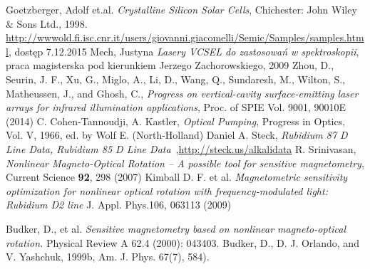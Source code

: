 \documentclass[a4paper,10pt,twoside]{report}
\begin{document}
\begin{thebibliography}{99}
 Goetzberger, Adolf et.al. \emph{Crystalline Silicon Solar Cells}, Chichester: John Wiley \& Sons Ltd., 1998.
 \url{http://wwwold.fi.isc.cnr.it/users/giovanni.giacomelli/Semic/Samples/samples.html}, dostęp 7.12.2015
  Mech, Justyna \emph{Lasery VCSEL do zastosowań w spektroskopii}, praca magisterska pod kierunkiem Jerzego Zachorowskiego, 2009
 Zhou, D., Seurin, J. F., Xu, G., Miglo, A., Li, D., Wang, Q., Sundaresh, M., Wilton, S., Matheussen, J., and  Ghosh, C., \emph{Progress on vertical-cavity surface-emitting laser arrays for infrared illumination applications},  Proc. of SPIE Vol. 9001, 90010E (2014)
  C. Cohen-Tannoudji, A. Kastler,
\emph{Optical  Pumping}, Progress in Optics, Vol. V, 1966, ed. by
Wolf E. (North-Holland)
 Daniel A. Steck, \emph{Rubidium 87 D Line Data, Rubidium 85 D Line Data}~,\url{http://steck.us/alkalidata}
 R. Srinivasan,\textit{ Nonlinear Magneto-Optical Rotation – A possible tool for sensitive magnetometry}, Current Science \textbf{92}, 298 (2007)
 Kimball D. F. et al.  \emph{Magnetometric sensitivity optimization for nonlinear optical rotation with
frequency-modulated light: Rubidium D2 line} J. Appl. Phys.106, 063113 (2009)


 Budker, D., et al. \emph{Sensitive magnetometry based on nonlinear magneto-optical rotation.} Physical Review A 62.4 (2000): 043403.
 Budker, D., D. J. Orlando, and V. Yashchuk, 1999b, Am. J. Phys. 67(7), 584).

\end{thebibliography}
\end{document}
